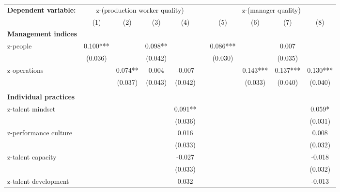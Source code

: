 {
\begin{tabular}{l*{9}{c}}
\toprule
\textbf{Dependent variable:}  &\multicolumn{4}{c}{\textcolor{black}{z-(production worker quality)}}& & \multicolumn{4}{c}{\textcolor{black}{z-(manager quality)}} \\    \cline{2-5} \cline{7-10} 
				             &\multicolumn{1}{c}{(1)}&\multicolumn{1}{c}{(2)}&\multicolumn{1}{c}{(3)}&\multicolumn{1}{c}{(4)}&&\multicolumn{1}{c}{(5)}&\multicolumn{1}{c}{(6)}&\multicolumn{1}{c}{(7)}&\multicolumn{1}{c}{(8)}\\
                \midrule
 \textbf{Management indices} \\
z-people        &    0.100***&            &    0.098** &            &&    0.086***&            &    0.007   &            \\
                &  (0.036)   &            &  (0.042)   &            &&  (0.030)   &            &  (0.035)   &            \\
z-operations    &            &    0.074** &    0.004   &   -0.007   &&            &    0.143***&    0.137***&    0.130***\\
                &            &  (0.037)   &  (0.043)   &  (0.042)   &&            &  (0.033)   &  (0.040)   &  (0.040)   \\
                \\
\textbf{Individual practices} \\
z-talent mindset        &            &            &            &    0.091** &&            &            &            &    0.059*  \\
                &            &            &            &  (0.036)   &            &&            &            &  (0.031)   \\
z-performance culture        &            &            &            &    0.016   &&            &            &            &    0.008   \\
                &            &            &            &  (0.033)   &&            &            &            &  (0.032)   \\
z-talent capacity        &            &            &            &   -0.027   &&            &            &            &   -0.018   \\
                &            &            &            &  (0.033)   &&            &            &            &  (0.032)   \\
z-talent development        &            &            &            &    0.032   &&            &            &            &   -0.013   \\

\end{tabular}}
